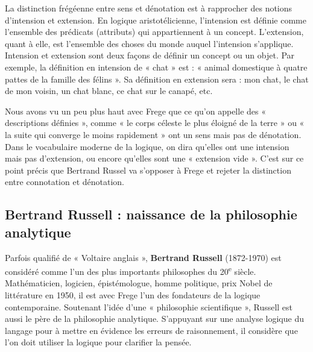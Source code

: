 La distinction frégéenne entre sens et dénotation est à rapprocher des notions d’intension et extension. En logique aristotélicienne, l’intension est définie comme l’ensemble des prédicats (attributs) qui appartiennent à un concept. L’extension, quant à elle, est l’ensemble des choses du monde auquel l’intension s’applique. Intension et extension sont deux façons de définir un concept ou un objet. Par exemple, la définition en intension de « chat » est : « animal domestique à quatre pattes de la famille des félins ». Sa définition en extension sera : mon chat, le chat de mon voisin, un chat blanc, ce chat sur le canapé, etc.

Nous avons vu un peu plus haut avec Frege que ce qu’on appelle des « descriptions définies », comme « le corps céleste le plus éloigné de la terre » ou « la suite qui converge le moins rapidement » ont un sens mais pas de dénotation. Dans le vocabulaire moderne de la logique, on dira qu’elles ont une intension mais pas d’extension, ou encore qu’elles sont une « extension vide ». C’est sur ce point précis que Bertrand Russel va s’opposer à Frege et rejeter la distinction entre connotation et dénotation.

\subsection{Bertrand Russell : naissance de la philosophie analytique}
Parfois qualifié de « Voltaire anglais », \textbf{Bertrand Russell} (1872-1970) est considéré comme l’un des plus importants philosophes du 20\textsuperscript{e} siècle. Mathématicien, logicien, épistémologue, homme politique, prix Nobel de littérature en 1950, il est avec Frege l’un des fondateurs de la logique contemporaine. Soutenant l’idée d’une « philosophie scientifique », Russell est aussi le père de la philosophie analytique. S’appuyant sur une analyse logique du langage pour à mettre en évidence les erreurs de raisonnement, il considère que l’on doit utiliser la logique pour clarifier la pensée.

